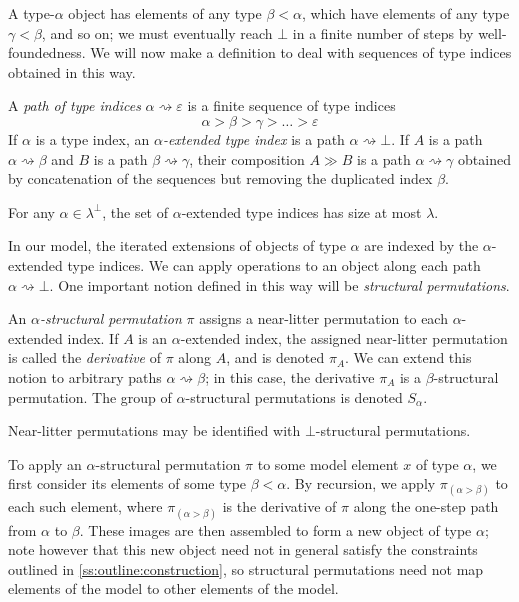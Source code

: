 A type-\( \alpha \) object has elements of any type \( \beta < \alpha \), which have elements of any type \( \gamma < \beta \), and so on; we must eventually reach \( \bot \) in a finite number of steps by well-foundedness.
We will now make a definition to deal with sequences of type indices obtained in this way.
\begin{definition}
    A \emph{path of type indices} \( \alpha \rightsquigarrow \varepsilon \) is a finite sequence of type indices
    \[ \alpha > \beta > \gamma > \dots > \varepsilon \]
    If \( \alpha \) is a type index, an \emph{\( \alpha \)-extended type index} is a path \( \alpha \rightsquigarrow \bot \).
    If \( A \) is a path \( \alpha \rightsquigarrow \beta \) and \( B \) is a path \( \beta \rightsquigarrow \gamma \), their composition \( A \gg B \) is a path \( \alpha \rightsquigarrow \gamma \) obtained by concatenation of the sequences but removing the duplicated index \( \beta \).
\end{definition}
\begin{remark}
    \label{rk:mk_extended_index}
    For any \( \alpha \in \lambda^\bot \), the set of \( \alpha \)-extended type indices has size at most \( \lambda \).
\end{remark}
In our model, the iterated extensions of objects of type \( \alpha \) are indexed by the \( \alpha \)-extended type indices.
We can apply operations to an object along each path \( \alpha \rightsquigarrow \bot \).
One important notion defined in this way will be \emph{structural permutations}.
\begin{definition}
    \label{def:struct_perm}
    An \emph{\( \alpha \)-structural permutation} \( \pi \) assigns a near-litter permutation to each \( \alpha \)-extended index.
    If \( A \) is an \( \alpha \)-extended index, the assigned near-litter permutation is called the \emph{derivative} of \( \pi \) along \( A \), and is denoted \( \pi_A \).
    We can extend this notion to arbitrary paths \( \alpha \rightsquigarrow \beta \); in this case, the derivative \( \pi_A \) is a \( \beta \)-structural permutation.
    The group of \( \alpha \)-structural permutations is denoted \( S_\alpha \).
\end{definition}
\begin{remark}
    Near-litter permutations may be identified with \( \bot \)-structural permutations.
\end{remark}
To apply an \( \alpha \)-structural permutation \( \pi \) to some model element \( x \) of type \( \alpha \), we first consider its elements of some type \( \beta < \alpha \).
By recursion, we apply \( \pi_{(\alpha > \beta)} \) to each such element, where \( \pi_{(\alpha > \beta)} \) is the derivative of \( \pi \) along the one-step path from \( \alpha \) to \( \beta \).
These images are then assembled to form a new object of type \( \alpha \); note however that this new object need not in general satisfy the constraints outlined in \cref{ss:outline:construction}, so structural permutations need not map elements of the model to other elements of the model.

